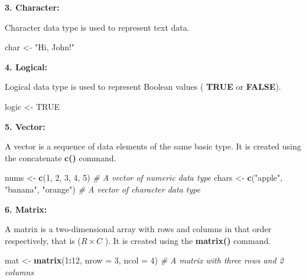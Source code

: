 \documentclass[
]{book}
\newenvironment{Shaded}{\begin{snugshade}}{\end{snugshade}}
\newcommand{\AttributeTok}[1]{\textcolor[rgb]{0.13,0.29,0.53}{#1}}
\newcommand{\CommentTok}[1]{\textcolor[rgb]{0.56,0.35,0.01}{\textit{#1}}}
\newcommand{\ConstantTok}[1]{\textcolor[rgb]{0.56,0.35,0.01}{#1}}
\newcommand{\DecValTok}[1]{\textcolor[rgb]{0.00,0.00,0.81}{#1}}
\newcommand{\FunctionTok}[1]{\textcolor[rgb]{0.13,0.29,0.53}{\textbf{#1}}}
\newcommand{\NormalTok}[1]{#1}
\newcommand{\OtherTok}[1]{\textcolor[rgb]{0.56,0.35,0.01}{#1}}
\newcommand{\SpecialCharTok}[1]{\textcolor[rgb]{0.81,0.36,0.00}{\textbf{#1}}}
\newcommand{\StringTok}[1]{\textcolor[rgb]{0.31,0.60,0.02}{#1}}
\begin{document}
\textbf{3. Character:}

Character data type is used to represent text data.

\begin{Shaded}
\begin{Highlighting}[]
\NormalTok{char }\OtherTok{\textless{}{-}} \StringTok{"Hi, John!"}
\end{Highlighting}
\end{Shaded}

\textbf{4. Logical:}

Logical data type is used to represent Boolean values ( \textbf{TRUE} or \textbf{FALSE}).

\begin{Shaded}
\begin{Highlighting}[]
\NormalTok{logic }\OtherTok{\textless{}{-}} \ConstantTok{TRUE}
\end{Highlighting}
\end{Shaded}

\textbf{5. Vector:}

A vector is a sequence of data elements of the same basic type. It is created using the concatenate \textbf{c()} command.

\begin{Shaded}
\begin{Highlighting}[]
\NormalTok{nums }\OtherTok{\textless{}{-}} \FunctionTok{c}\NormalTok{(}\DecValTok{1}\NormalTok{, }\DecValTok{2}\NormalTok{, }\DecValTok{3}\NormalTok{, }\DecValTok{4}\NormalTok{, }\DecValTok{5}\NormalTok{) }\CommentTok{\# A vector of numeric data type}
\NormalTok{chars }\OtherTok{\textless{}{-}} \FunctionTok{c}\NormalTok{(}\StringTok{"apple"}\NormalTok{, }\StringTok{"banana"}\NormalTok{, }\StringTok{"orange"}\NormalTok{)  }\CommentTok{\# A vector of character data type}
\end{Highlighting}
\end{Shaded}

\textbf{6. Matrix:}

A matrix is a two-dimensional array with rows and columns in that order respectively, that is (\(R \times C\) ). It is created using the \textbf{matrix()} command.

\begin{Shaded}
\begin{Highlighting}[]
\NormalTok{mat }\OtherTok{\textless{}{-}} \FunctionTok{matrix}\NormalTok{(}\DecValTok{1}\SpecialCharTok{:}\DecValTok{12}\NormalTok{, }\AttributeTok{nrow =} \DecValTok{3}\NormalTok{, }\AttributeTok{ncol =} \DecValTok{4}\NormalTok{) }\CommentTok{\# A matrix with three rows and 2 columns }
\end{Highlighting}
\end{Shaded}
\end{document}
